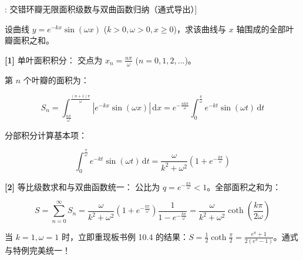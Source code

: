 \documentclass[11pt,a4paper,UTF8]{ctexart}
\begin{document}
\begin{thmbox}[模型[10]: 交错环瓣无限面积级数与双曲函数归纳（通式导出）]

设曲线 $y = e^{-kx}\sin(\omega x)$ ($k > 0, \omega > 0, x \geqslant 0$)，求该曲线与 $x$ 轴围成的全部叶瓣面积之和。

\textbf{[1]} 单叶面积积分：
交点为 $x_n = \frac{n\pi}{\omega}$ ($n = 0, 1, 2, \dots$)。

第 $n$ 个叶瓣的面积为：


\begin{equation*}
S_n = \int_{\frac{n\pi}{\omega}}^{\frac{(n+1)\pi}{\omega}} |e^{-kx}\sin(\omega x)|\,\mathrm{d}x = e^{-\frac{nk\pi}{\omega}} \int_0^{\frac{\pi}{\omega}} e^{-kt}\sin(\omega t)\,\mathrm{d}t
\end{equation*}


分部积分计算基本项：


\begin{equation*}
\int_0^{\frac{\pi}{\omega}} e^{-kt}\sin(\omega t)\,\mathrm{d}t = \frac{\omega}{k^2+\omega^2}\left(1 + e^{-\frac{k\pi}{\omega}}\right)
\end{equation*}


\textbf{[2]} 等比级数求和与双曲函数统一：
公比为 $q = e^{-\frac{k\pi}{\omega}} < 1$。全部面积之和为：


\begin{equation*}
S = \sum_{n=0}^\infty S_n = \frac{\omega}{k^2+\omega^2}\left(1 + e^{-\frac{k\pi}{\omega}}\right) \frac{1}{1 - e^{-\frac{k\pi}{\omega}}} = \frac{\omega}{k^2+\omega^2} \coth\left(\frac{k\pi}{2\omega}\right)
\end{equation*}


当 $k=1, \omega=1$ 时，立即重现板书例 10.4 的结果：$S = \frac{1}{2}\coth\frac{\pi}{2} = \frac{e^\pi+1}{2(e^\pi-1)}$。通式与特例完美统一！
\end{thmbox}
\end{document}
